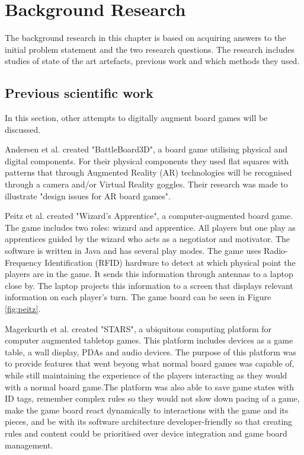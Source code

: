 \chapter{Background Research}\label{ch:bgres}
The background research in this chapter is based on acquiring answers to the initial problem statement and the two research questions. The research includes studies of state of the art artefacts, previous work and which methods they used. 
\section{Previous scientific work}
In this section, other attempts to digitally augment board games will be discussed.

Andersen et al. \citep{andersen_designing_2004} created "BattleBoard3D", a board game utilising physical and digital components. For their physical components they used flat squares with patterns that through Augmented Reality (AR) technologies will be recognised through a camera and/or Virtual Reality goggles. Their research was made to illustrate "design issues for AR board games".

Peitz et al. \citep{peitzWizards2006} created "Wizard's Apprentice", a computer-augmented board game. The game includes two roles: wizard and apprentice. All players but one play as apprentices guided by the wizard who acts as a negotiator and motivator. The software is written in Java and has several play modes. The game uses Radio-Frequency Identification (RFID) hardware to detect at which physical point the players are in the game. It sends this information through antennas to a laptop close by. The laptop projects this information to a screen that displays relevant information on each player's turn. The game board can be seen in Figure \ref{fig:peitz}.

Magerkurth et al.\citep{magStars} created "STARS", a ubiquitous computing platform for computer augmented tabletop games. This platform includes devices as a game table, a wall display, PDAs and audio devices. The purpose of this platform was to provide features that went beyong what normal board games was capable of, while still maintaining the experience of the players interacting as they would with a normal board game.The platform was also able to save game states with ID tags, remember complex rules so they would not slow down pacing of a game, make  the game board react dynamically to interactions with the game and its pieces, and be with its software architecture developer-friendly so that creating rules and content could be prioritised over device integration and game board management. 

